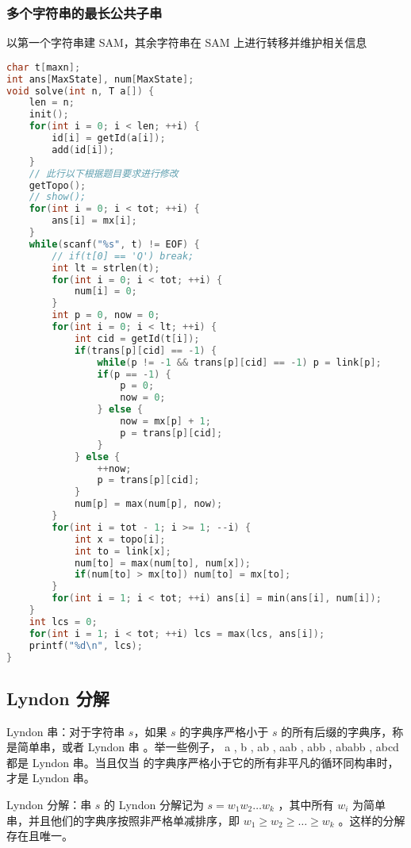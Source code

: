 \subsubsection{多个字符串的最长公共子串}

以第一个字符串建 SAM，其余字符串在 SAM 上进行转移并维护相关信息

\begin{lstlisting}[language=C++]
char t[maxn];
int ans[MaxState], num[MaxState];
void solve(int n, T a[]) {
    len = n;
    init();
    for(int i = 0; i < len; ++i) {
        id[i] = getId(a[i]);
        add(id[i]);
    }
    // 此行以下根据题目要求进行修改
    getTopo();
    // show();
    for(int i = 0; i < tot; ++i) {
        ans[i] = mx[i];
    }
    while(scanf("%s", t) != EOF) {
        // if(t[0] == 'Q') break;
        int lt = strlen(t);
        for(int i = 0; i < tot; ++i) {
            num[i] = 0;
        }
        int p = 0, now = 0;
        for(int i = 0; i < lt; ++i) {
            int cid = getId(t[i]);
            if(trans[p][cid] == -1) {
                while(p != -1 && trans[p][cid] == -1) p = link[p];
                if(p == -1) {
                    p = 0;
                    now = 0;
                } else {
                    now = mx[p] + 1;
                    p = trans[p][cid];
                }
            } else {
                ++now;
                p = trans[p][cid];
            }
            num[p] = max(num[p], now);
        }
        for(int i = tot - 1; i >= 1; --i) {
            int x = topo[i];
            int to = link[x];
            num[to] = max(num[to], num[x]);
            if(num[to] > mx[to]) num[to] = mx[to];
        }
        for(int i = 1; i < tot; ++i) ans[i] = min(ans[i], num[i]);
    }
    int lcs = 0;
    for(int i = 1; i < tot; ++i) lcs = max(lcs, ans[i]);
    printf("%d\n", lcs);
}    
\end{lstlisting}

\subsection{Lyndon 分解}

Lyndon 串：对于字符串 $s$，如果 $s$ 的字典序严格小于 $s$ 的所有后缀的字典序，称  是简单串，或者 Lyndon 串 。举一些例子， a , b , ab , aab , abb , ababb , abcd 都是 Lyndon 串。当且仅当  的字典序严格小于它的所有非平凡的循环同构串时，  才是 Lyndon 串。

Lyndon 分解：串 $s$ 的 Lyndon 分解记为 $s = w_1 w_2 \dots w_k$ ，其中所有 $w_i$ 为简单串，并且他们的字典序按照非严格单减排序，即 $w_1 \ge w_2 \ge \dots \ge w_k$ 。这样的分解存在且唯一。


